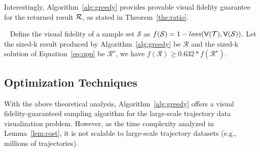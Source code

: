Interestingly, Algorithm~\ref{alg:greedy} provides provable visual fidelity guarantee for the returned result $\mathcal{R}$, as stated in Theorem~\ref{the:ratio}.

\begin{theorem}~\label{the:ratio}
Define the visual fidelity of a sample set $\mathcal{S}$ as $f(\mathcal{S})=1-loss(\mathsf{V}(\mathcal{T}),\mathsf{V}(\mathcal{S}))$. Let the sized-k result produced by Algorithm~\ref{alg:greedy} be $\mathcal{R}$ and the sized-k solution of Equation~\eqref{eq:opp} be $\mathcal{R}^{\star}$, we have $f(\mathcal{R})\ge 0.632*f(\mathcal{R}^{\star})$.
\end{theorem}

%


\subsection{Optimization Techniques}\label{sec:opt}
With the above theoretical analysis, Algorithm~\ref{alg:greedy} offers a visual fidelity-guaranteed sampling algorithm for the large-scale trajectory data visualization problem.
However, as the time complexity analyzed in Lemma~\ref{lem:cost}, it is not scalable to large-scale trajectory datasets (e.g., millions of trajectories).

